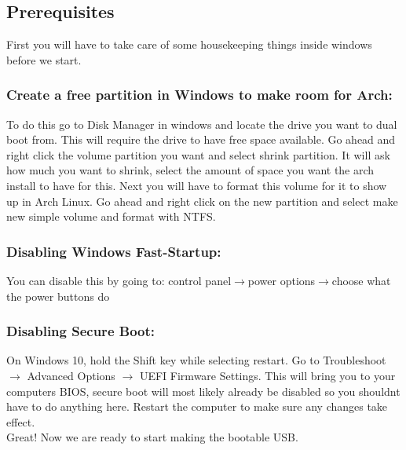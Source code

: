 \documentclass[12pt]{article}
\begin{document}
\color{pink}
\subsection*{Prerequisites} \color{white}
\begin{adjustwidth}{0.5cm}{}
First you will have to take care of some housekeeping things inside windows before we start.
\end{adjustwidth}
\color{pink}
\subsubsection*{Create a free partition in Windows to make room for Arch:} \color{white}


\begin{adjustwidth}{0.5cm}{}
To do this go to Disk Manager in windows and locate the drive you want to dual boot from. This will require the drive to have free space available. Go ahead and right click the volume partition you want and select shrink partition. It will ask how much you want to shrink, select the amount of space you want the arch install to have for this. Next you will have to format this volume for it to show up in Arch Linux. Go ahead and right click on the new partition and select make new simple volume and format with NTFS.
\end{adjustwidth}

\color{pink}
\subsubsection*{Disabling Windows Fast-Startup:} \color{white}

\begin{adjustwidth}{0.5cm}{} %
You can disable this by going to: control panel$\rightarrow$power options$\rightarrow$choose what the power buttons do

\end{adjustwidth}

\color{pink}
\subsubsection*{Disabling Secure Boot:} \color{white}

\begin{adjustwidth}{0.5cm}{} %

On Windows 10, hold the Shift key while selecting restart. Go to Troubleshoot $\rightarrow$ Advanced Options $\rightarrow$ UEFI Firmware Settings. This will bring you to your computers BIOS, secure boot will most likely already be disabled so you shouldnt have to do anything here. Restart the computer to make sure any changes take effect.\\

Great! Now we are ready to start making the bootable USB.
\end{adjustwidth}
\end{document}
